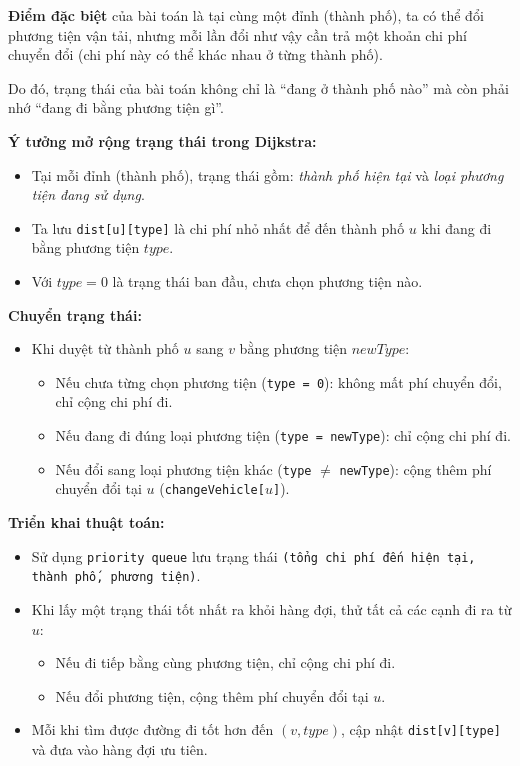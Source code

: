 \documentclass{article}
\begin{document}
\textbf{Điểm đặc biệt} của bài toán là tại cùng một đỉnh (thành phố), ta có thể đổi phương tiện vận tải, nhưng mỗi lần đổi như vậy cần trả một khoản chi phí chuyển đổi (chi phí này có thể khác nhau ở từng thành phố).

Do đó, trạng thái của bài toán không chỉ là “đang ở thành phố nào” mà còn phải nhớ “đang đi bằng phương tiện gì”. 

\textbf{Ý tưởng mở rộng trạng thái trong Dijkstra:}
\begin{itemize}
    \item Tại mỗi đỉnh (thành phố), trạng thái gồm: \textit{thành phố hiện tại} và \textit{loại phương tiện đang sử dụng}.
    \item Ta lưu \texttt{dist[u][type]} là chi phí nhỏ nhất để đến thành phố $u$ khi đang đi bằng phương tiện $type$.
    \item Với $type = 0$ là trạng thái ban đầu, chưa chọn phương tiện nào.
\end{itemize}

\textbf{Chuyển trạng thái:}
\begin{itemize}
    \item Khi duyệt từ thành phố $u$ sang $v$ bằng phương tiện $newType$:
        \begin{itemize}
            \item Nếu chưa từng chọn phương tiện (\texttt{type = 0}): không mất phí chuyển đổi, chỉ cộng chi phí đi.
            \item Nếu đang đi đúng loại phương tiện (\texttt{type = newType}): chỉ cộng chi phí đi.
            \item Nếu đổi sang loại phương tiện khác (\texttt{type} $\neq$ \texttt{newType}): cộng thêm phí chuyển đổi tại $u$ (\texttt{changeVehicle[$u$]}).
        \end{itemize}
\end{itemize}

\textbf{Triển khai thuật toán:}
\begin{itemize}
    \item Sử dụng \texttt{priority queue} lưu trạng thái \texttt{(tổng chi phí đến hiện tại, thành phố, phương tiện)}.
    \item Khi lấy một trạng thái tốt nhất ra khỏi hàng đợi, thử tất cả các cạnh đi ra từ $u$:
        \begin{itemize}
            \item Nếu đi tiếp bằng cùng phương tiện, chỉ cộng chi phí đi.
            \item Nếu đổi phương tiện, cộng thêm phí chuyển đổi tại $u$.
        \end{itemize}
    \item Mỗi khi tìm được đường đi tốt hơn đến $(v, type)$, cập nhật \texttt{dist[v][type]} và đưa vào hàng đợi ưu tiên.
\end{itemize}
\end{document}
